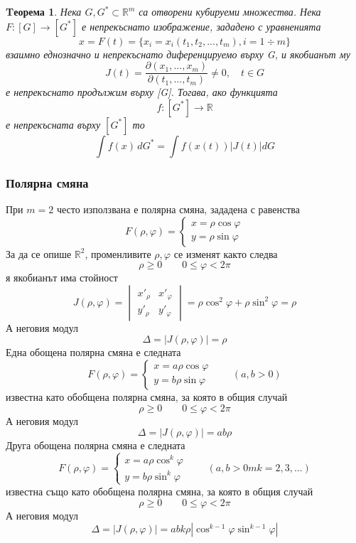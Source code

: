 \documentclass[a4paper,fleqn,12pt]{article}
\newtheorem{theorem}{Tеорема}[subsection]
\theoremstyle{definition}
\begin{document}
\begin{theorem}
Нека $G,G^* \subset \mathbb{R}^m$ са отворени кубируеми множества. Нека $F: [G] \to [G^*] $ е непрекъснато изображение, зададено с уравненията 
$$x = F(t) = \{x_i = x_i(t_1,t_2, ..., t_m), i = 1 \div m \}$$
взаимно еднозначно и непрекъснато диференцируемо върху G, и якобианът му
$$J(t) = \frac{\partial (x_1, ..., x_m)}{\partial (t_1, ..., t_m)} \neq 0, \quad t \in G$$
е непрекъснато продължим върху [G]. Тогава, ако функцията 
$$f: [G^*] \to \mathbb{R}$$
е непрекъсната върху $[G^*]$ то
$$\int f(x) \, dG^* = \int f(x(t)) \vert J(t) \vert dG$$
\end{theorem}

\subsubsection{Полярна смяна}
При $m = 2$ често използвана е полярна смяна, зададена с равенства 
$$F(\rho, \varphi) = \begin{cases} x = \rho \cos \varphi \\  y = \rho \sin \varphi \end{cases}$$
За да се опише $\mathbb{R}^2$, променливите $\rho, \varphi$ се изменят както следва 
$$\rho \geq 0 \qquad 0 \leq \varphi < 2\pi$$
я якобианът има стойност
$$J(\rho, \varphi) = \begin{vmatrix} x'_{\rho} &   x'_{\varphi} \\  y'_{\rho} &  y'_{\varphi}\end{vmatrix} = \rho \cos^2 \varphi + \rho \sin^2 \varphi = \rho$$
А неговия модул 
$$\Delta = |J(\rho, \varphi)| = \rho $$
Една обощена полярна смяна е следната 
$$F(\rho, \varphi) = \begin{cases} x = a\rho \cos \varphi \\  y = b\rho \sin \varphi \end{cases} \qquad (a,b > 0)$$
известна като обобщена полярна смяна, за която в общия случай
$$\rho \geq 0 \qquad 0 \leq \varphi < 2\pi$$
А неговия модул 
$$\Delta = |J(\rho, \varphi)| = ab\rho $$
Друга обощена полярна смяна е следната 
$$F(\rho, \varphi) = \begin{cases} x = a\rho \cos^k \varphi \\  y = b\rho \sin^k \varphi \end{cases} \qquad (a,b > 0m k = 2, 3, ...)$$
известна също като обобщена полярна смяна, за която в общия случай
$$\rho \geq 0 \qquad 0 \leq \varphi < 2\pi$$
А неговия модул 
$$\Delta = |J(\rho, \varphi)| = abk\rho |\cos^{k-1} \varphi \sin^{k-1} \varphi|$$
\end{document}
